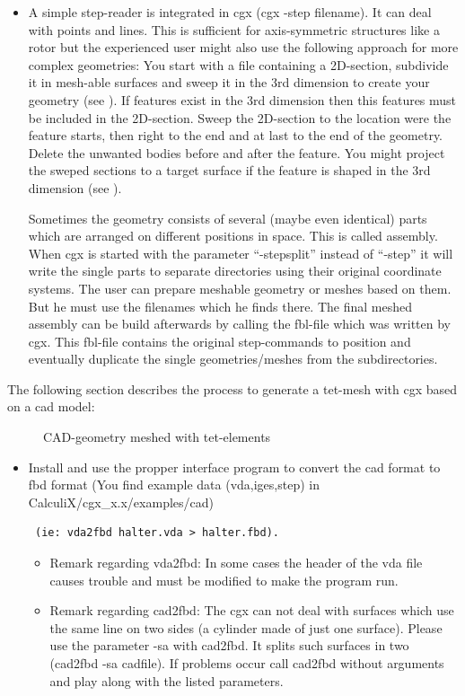 \documentclass{article}
\begin{document}
\begin{appendix}
\begin{itemize}
\item A simple step-reader is integrated in cgx (cgx -step filename). It can deal with points and lines. This is sufficient for axis-symmetric structures like a rotor but the experienced user might also use the following approach for more complex geometries: You start with a file containing a 2D-section, subdivide it in mesh-able surfaces and sweep it in the 3rd dimension to create your geometry (see ). If features exist in the 3rd dimension then this features must be included in the 2D-section. Sweep the 2D-section to the location were the feature starts, then right to the end and at last to the end of the geometry. Delete the unwanted bodies before and after the feature. You might project the sweped sections to a target surface if the feature is shaped in the 3rd dimension (see ).

Sometimes the geometry consists of several (maybe even identical) parts which are arranged on different positions in space. This is called assembly. When cgx is started with the parameter ``-stepsplit'' instead of ``-step'' it will write the single parts to separate directories using their original coordinate systems. The user can prepare meshable geometry or meshes based on them. But he must use the filenames which he finds there. The final meshed assembly can be build afterwards by calling the fbl-file which was written by cgx. This fbl-file contains the original step-commands to position and eventually duplicate the single geometries/meshes from the subdirectories.   
\end{itemize}

The following section describes the process to generate a tet-mesh with cgx based on a cad model:


\begin{figure}[h]
\caption{\label{halter} CAD-geometry meshed with tet-elements }
\end{figure}

\begin{itemize}

\item Install and use the propper interface program to convert the cad format to fbd format (You find example data (vda,iges,step) in CalculiX/cgx\_x.x/examples/cad)\begin{verbatim} (ie: vda2fbd halter.vda > halter.fbd). \end{verbatim}
\begin{itemize}
\item Remark regarding vda2fbd: In some cases the header of the vda file causes trouble and must be modified to make the program run.
\item Remark regarding cad2fbd: The cgx can not deal with surfaces which use the same line on two sides (a cylinder made of just one surface). Please use the parameter -sa with cad2fbd. It splits such surfaces in two (cad2fbd -sa cadfile). If problems occur call cad2fbd without arguments and play along with the listed parameters.
\end{itemize}


\end{itemize}
\end{appendix}
\end{document}
